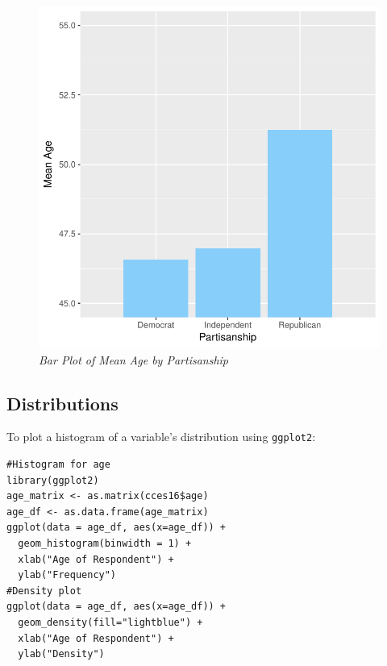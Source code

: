 \documentclass[12pt, letterpaper,notitlepage]{article}
\begin{document}
\begin{figure}[!ht]
\caption{\textsl{Bar Plot of Mean Age by Partisanship}}\label{fig:age_bp_sg}
\centering
  \includegraphics[width=.6\linewidth]{age_sg_bp.pdf}
\end{figure}

\clearpage

\subsection{Distributions}
To plot a histogram of a variable's distribution using \texttt{ggplot2}:

\begin{lstlisting}
#Histogram for age
library(ggplot2)
age_matrix <- as.matrix(cces16$age)
age_df <- as.data.frame(age_matrix)
ggplot(data = age_df, aes(x=age_df)) +
  geom_histogram(binwidth = 1) + 
  xlab("Age of Respondent") +
  ylab("Frequency")
#Density plot
ggplot(data = age_df, aes(x=age_df)) +
  geom_density(fill="lightblue") +
  xlab("Age of Respondent") +
  ylab("Density")
\end{lstlisting}
\end{document}
